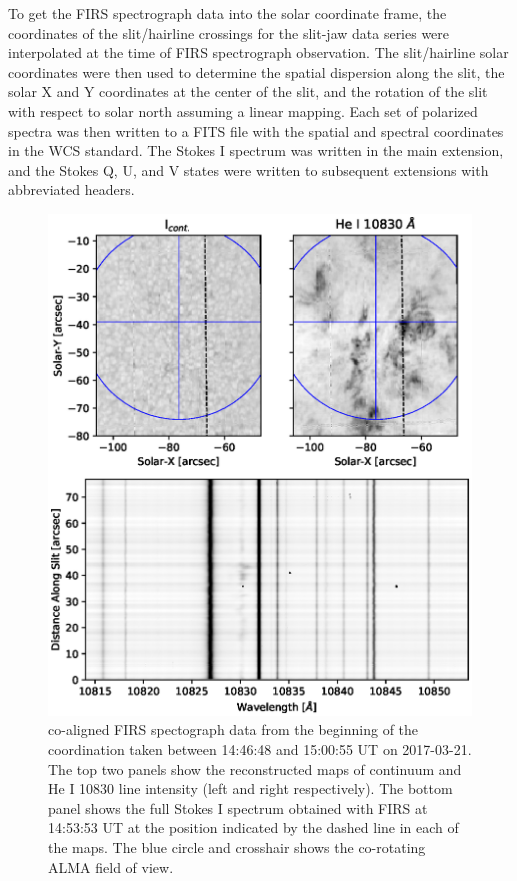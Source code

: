 \documentclass[twocolumn]{aastex62}
\begin{document}
To get the FIRS spectrograph data into the solar coordinate frame, the coordinates of the slit/hairline crossings for the slit-jaw data series were interpolated at the time of FIRS spectrograph observation.  The slit/hairline solar coordinates were then used to determine the spatial dispersion along the slit, the solar X and Y coordinates at the center of the slit, and the rotation of the slit with respect to solar north assuming a linear mapping.  Each set of polarized spectra was then written to a FITS file with the spatial and spectral coordinates in the WCS standard.  The Stokes I spectrum was written in the main extension, and the Stokes Q, U, and V states were written to subsequent extensions with abbreviated headers.

\begin{figure}
    \centering
    \includegraphics[width=5in]{./figures/FIRS_example.eps}
    \caption{co-aligned FIRS spectograph data from the beginning of the coordination taken between 14:46:48 and 15:00:55 UT on 2017-03-21.  The top two panels show the reconstructed maps of continuum and He I 10830 line intensity (left and right respectively).  The bottom panel shows the full Stokes I spectrum obtained with FIRS at 14:53:53 UT at the position indicated by the dashed line in each of the maps.  The blue circle and crosshair shows the co-rotating ALMA field of view.}
    \label{fig:FIRS}
\end{figure}
\end{document}
